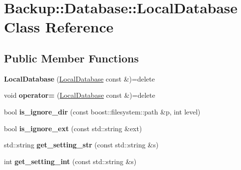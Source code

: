 \hypertarget{class_backup_1_1_database_1_1_local_database}{}\section{Backup\+:\+:Database\+:\+:Local\+Database Class Reference}
\label{class_backup_1_1_database_1_1_local_database}
\subsection*{Public Member Functions}
\begin{DoxyCompactItemize}
\item 
\mbox{\label{class_backup_1_1_database_1_1_local_database_a5a1800d6a84e1ee09fb8ed03c1999d1a}} 
{\bfseries Local\+Database} (\hyperlink{class_backup_1_1_database_1_1_local_database}{Local\+Database} const \&)=delete
\item 
\mbox{\label{class_backup_1_1_database_1_1_local_database_a018b956b175c068c57958ae8b466e2bd}} 
void {\bfseries operator=} (\hyperlink{class_backup_1_1_database_1_1_local_database}{Local\+Database} const \&)=delete
\item 
\mbox{\label{class_backup_1_1_database_1_1_local_database_ab7bc1e783228e6413af275f1254d0c91}} 
bool {\bfseries is\+\_\+ignore\+\_\+dir} (const boost\+::filesystem\+::path \&p, int level)
\item 
\mbox{\label{class_backup_1_1_database_1_1_local_database_a73d2320e6e1c3241f2b0dc8438c963e3}} 
bool {\bfseries is\+\_\+ignore\+\_\+ext} (const std\+::string \&ext)
\item 
\mbox{\label{class_backup_1_1_database_1_1_local_database_a9ebeda94ba4b1b981fa321ab2a60adb2}} 
std\+::string {\bfseries get\+\_\+setting\+\_\+str} (const std\+::string \&s)
\item 
\mbox{\label{class_backup_1_1_database_1_1_local_database_aa7aa1872a73201ac03ebc6de375fd1d5}} 
int {\bfseries get\+\_\+setting\+\_\+int} (const std\+::string \&s)

\end{DoxyCompactItemize}
